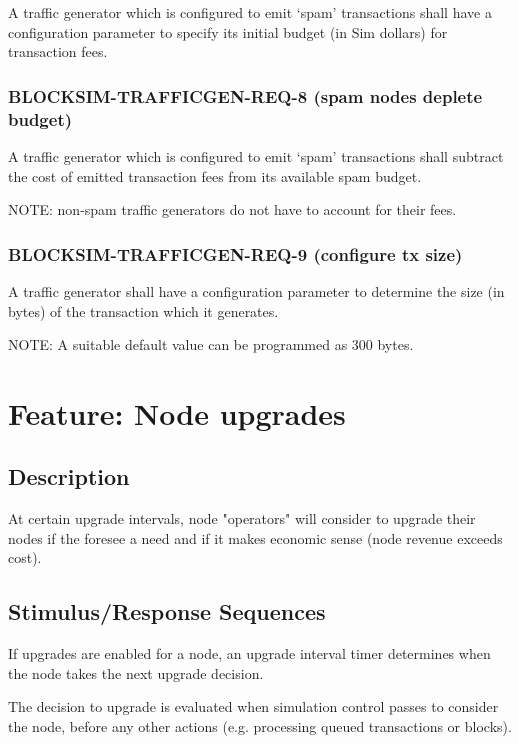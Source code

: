 \documentclass{scrreprt}
\begin{document}
        A traffic generator which is configured to emit `spam' transactions
        shall have a configuration parameter to specify its initial budget
        (in Sim dollars) for transaction fees.

      \subsubsection{BLOCKSIM-TRAFFICGEN-REQ-8 (spam nodes deplete budget)}

        A traffic generator which is configured to emit `spam' transactions
        shall subtract the cost of emitted transaction fees from its available
        spam budget.

        NOTE: non-spam traffic generators do not have to account for their
        fees.

      \subsubsection{BLOCKSIM-TRAFFICGEN-REQ-9 (configure tx size)}

        A traffic generator shall have a configuration parameter to
        determine the size (in bytes) of the transaction which it generates.

        NOTE: A suitable default value can be programmed as 300 bytes.

  \section{Feature: Node upgrades}

    \subsection{Description}

      At certain upgrade intervals, node "operators" will consider to upgrade
      their nodes if the foresee a need and if it makes economic sense
      (node revenue exceeds cost).

    \subsection{Stimulus/Response Sequences}

      If upgrades are enabled for a node, an upgrade interval timer determines
      when the node takes the next upgrade decision.

      The decision to upgrade is evaluated when simulation control passes to
      consider the node, before any other actions (e.g. processing queued
      transactions or blocks).
\end{document}
